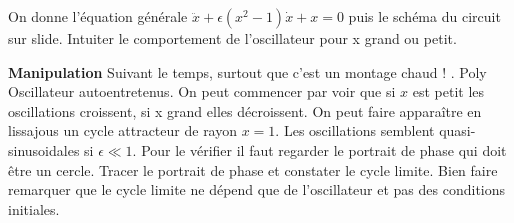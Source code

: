 \documentclass[french, a4paper, 10pt, twocolumn, landscape]{article}
\begin{document}
On donne l'équation générale $\ddot{x}+\epsilon(x^2-1)\dot{x}+x=0$ puis le schéma du circuit sur slide. Intuiter le comportement de l'oscillateur pour x grand ou petit.

\textbf{Manipulation} Suivant le temps, surtout que c'est un montage chaud ! . Poly Oscillateur autoentretenus. On peut commencer par voir que si $x$ est petit les oscillations croissent, si x grand elles décroissent. On peut faire apparaître en lissajous un cycle attracteur de rayon $x=1$. Les oscillations semblent quasi-sinusoidales si $\epsilon\ll 1$. Pour le vérifier il faut regarder le portrait de phase qui doit être un cercle. Tracer le portrait de phase  et constater le cycle limite. Bien faire remarquer que le cycle limite ne dépend que de l'oscillateur et pas des conditions initiales.
\end{document}
